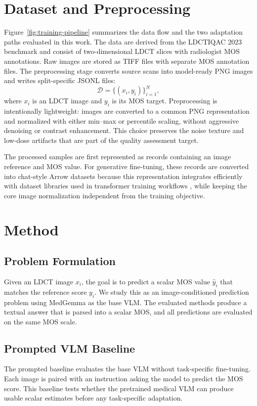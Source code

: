 \chapter{Dataset and Preprocessing}
Figure~\ref{fig:training-pipeline} summarizes the data flow and the two adaptation paths evaluated in this work. The data are derived from the LDCTIQAC 2023 benchmark \cite{lee2025low} and consist of two-dimensional LDCT slices with radiologist MOS annotations. Raw images are stored as TIFF files with separate MOS annotation files. The preprocessing stage converts source scans into model-ready PNG images and writes split-specific JSONL files:
\begin{equation}
  \mathcal{D}=\{(x_i, y_i)\}_{i=1}^{N},
\end{equation}
where $x_i$ is an LDCT image and $y_i$ is its MOS target. Preprocessing is intentionally lightweight: images are converted to a common PNG representation and normalized with either min--max or percentile scaling, without aggressive denoising or contrast enhancement. This choice preserves the noise texture and low-dose artifacts that are part of the quality assessment target.

The processed samples are first represented as records containing an image reference and MOS value. For generative fine-tuning, these records are converted into chat-style Arrow datasets because this representation integrates efficiently with dataset libraries used in transformer training workflows \cite{lhoest2021datasets}, while keeping the core image normalization independent from the training objective.

\chapter{Method}
\section{Problem Formulation}
Given an LDCT image $x_i$, the goal is to predict a scalar MOS value $\hat{y}_i$ that matches the reference score $y_i$. We study this as an image-conditioned prediction problem using MedGemma as the base VLM. The evaluated methods produce a textual answer that is parsed into a scalar MOS, and all predictions are evaluated on the same MOS scale.

\section{Prompted VLM Baseline}
The prompted baseline evaluates the base VLM without task-specific fine-tuning. Each image is paired with an instruction asking the model to predict the MOS score. This baseline tests whether the pretrained medical VLM can produce usable scalar estimates before any task-specific adaptation.

